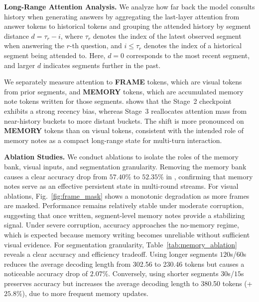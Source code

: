 \documentclass{article}
\begin{document}
\noindent\textbf{Long-Range Attention Analysis.}
\label{sec:analysis_attention}
We analyze how far back the model consults history when generating answers by aggregating the last-layer attention from answer tokens to historical tokens and grouping the attended history by segment distance $d=\tau_r-i$, where $\tau_r$ denotes the index of the latest observed segment when answering the $r$-th question, and $i\le\tau_r$ denotes the index of a historical segment being attended to. Here, $d=0$ corresponds to the most recent segment, and larger $d$ indicates segments further in the past.

We separately measure attention to \textbf{FRAME} tokens, which are visual tokens from prior segments, and \textbf{MEMORY} tokens, which are accumulated memory note tokens written for those segments.  shows that the Stage~2 checkpoint exhibits a strong recency bias, whereas Stage~3 reallocates attention mass from near-history buckets to more distant buckets. The shift is more pronounced on \textbf{MEMORY} tokens than on visual tokens, consistent with the intended role of memory notes as a compact long-range state for multi-turn interaction.

\noindent\textbf{Ablation Studies.}
\label{sec:analysis_ablation}
We conduct ablations to isolate the roles of the memory bank, visual inputs, and segmentation granularity. Removing the memory bank causes a clear accuracy drop from $57.40$\% to $52.35$\% in , confirming that memory notes serve as an effective persistent state in multi-round streams. For visual ablations, Fig.~\ref{fig:frame_mask} shows a monotonic degradation as more frames are masked. Performance remains relatively stable under moderate corruption, suggesting that once written, segment-level memory notes provide a stabilizing signal. Under severe corruption, accuracy approaches the no-memory regime, which is expected because memory writing becomes unreliable without sufficient visual evidence. For segmentation granularity, Table~\ref{tab:memory_ablation} reveals a clear accuracy and efficiency tradeoff. Using longer segments $120$s/$60$s reduces the average decoding length from 302.56 to 230.46 tokens but causes a noticeable accuracy drop of $2.07$\%. Conversely, using shorter segments $30$s/$15$s preserves accuracy but increases the average decoding length to 380.50 tokens (+$25.8$\%), due to more frequent memory updates.
\end{document}
